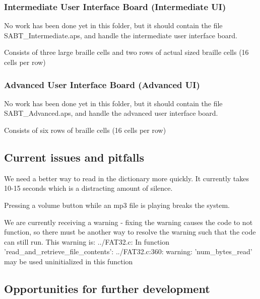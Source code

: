 \subsubsection*{Intermediate User Interface Board (Intermediate U\-I)}

No work has been done yet in this folder, but it should contain the file S\-A\-B\-T\-\_\-\-Intermediate.\-aps, and handle the intermediate user interface board.
\begin{DoxyItemize}
\item Consists of three large braille cells and two rows of actual sized braille cells (16 cells per row)
\end{DoxyItemize}

\subsubsection*{Advanced User Interface Board (Advanced U\-I)}

No work has been done yet in this folder, but it should contain the file S\-A\-B\-T\-\_\-\-Advanced.\-aps, and handle the advanced user interface board.
\begin{DoxyItemize}
\item Consists of six rows of braille cells (16 cells per row)
\end{DoxyItemize}

\subsection*{Current issues and pitfalls}


\begin{DoxyItemize}
\item We need a better way to read in the dictionary more quickly. It currently takes 10-\/15 seconds which is a distracting amount of silence.
\item Pressing a volume button while an mp3 file is playing breaks the system.
\item We are currently receiving a warning -\/ fixing the warning causes the code to not function, so there must be another way to resolve the warning such that the code can still run. This warning is\-: {\ttfamily ../\-F\-A\-T32.c\-: In function 'read\-\_\-and\-\_\-retrieve\-\_\-file\-\_\-contents'\-:} {\ttfamily ../\-F\-A\-T32.c\-:360\-: warning\-: 'num\-\_\-bytes\-\_\-read' may be used uninitialized in this function}
\end{DoxyItemize}

\subsection*{Opportunities for further development}


